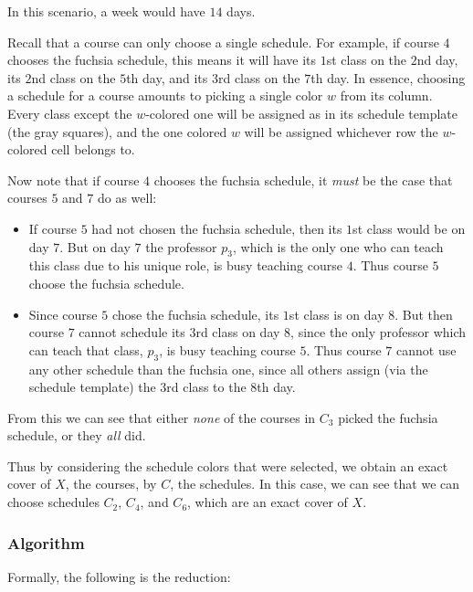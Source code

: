 In this scenario, a week would have $14$ days.

Recall that a course can only choose a single schedule. For example, if course $4$ chooses the {\color{Fuchsia}fuchsia} schedule, this means it will have its $1$st class on the $2$nd day, its $2$nd class on the $5$th day, and its $3$rd class on the $7$th day. In essence, choosing a schedule for a course amounts to picking a single color $w$ from its column. Every class except the $w$-colored one will be assigned as in its schedule template (the {\color{gray}gray} squares), and the one colored $w$ will be assigned whichever row the $w$-colored cell belongs to.


Now note that if course $4$ chooses the {\color{Fuchsia}fuchsia} schedule, it \emph{must} be the case that courses $5$ and $7$ do as well:
\begin{itemize}
\item If course $5$ had not chosen the {\color{Fuchsia}fuchsia} schedule, then its $1$st class would be on day $7$. But on day $7$ the professor $p_3$, which is the only one who can teach this class due to his unique role, is busy teaching course $4$. Thus course $5$ choose the {\color{Fuchsia}fuchsia} schedule.
\item Since course $5$ chose the {\color{Fuchsia}fuchsia} schedule, its $1$st class is on day $8$. But then course $7$ cannot schedule its $3$rd class on day $8$, since the only professor which can teach that class, $p_3$, is busy teaching course $5$. Thus course $7$ cannot use any other schedule than the {\color{Fuchsia}fuchsia} one, since all others assign (via the schedule template) the $3$rd class to the $8$th day.
\end{itemize}

From this we can see that either \emph{none} of the courses in {\color{Fuchsia}$C_3$} picked the {\color{Fuchsia}fuchsia} schedule, or they \emph{all} did.

Thus by considering the schedule colors that were selected, we obtain an exact cover of $X$, the courses, by $C$, the schedules. In this case, we can see that we can choose schedules {\color{Blue} $C_2$}, {\color{ForestGreen} $C_4$}, and {\color{Tan} $C_6$}, which are an exact cover of $X$.






\newpage
\subsubsection{Algorithm}
Formally, the following is the reduction:

